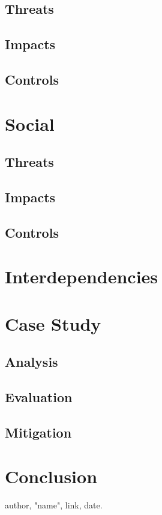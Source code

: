 \documentclass[11pt,a4paper,draft]{article}
\begin{document}
\subsection{Threats}

\subsection{Impacts}

\subsection{Controls}

\section{Social}

\subsection{Threats}

\subsection{Impacts}

\subsection{Controls}

\section{Interdependencies}

\section{Case Study}

\subsection{Analysis}

\subsection{Evaluation}

\subsection{Mitigation}

\section{Conclusion}

\cite{item}

\begin{thebibliography}{9}

author,
"name",
link,
date.

\end{thebibliography}
\end{document}

